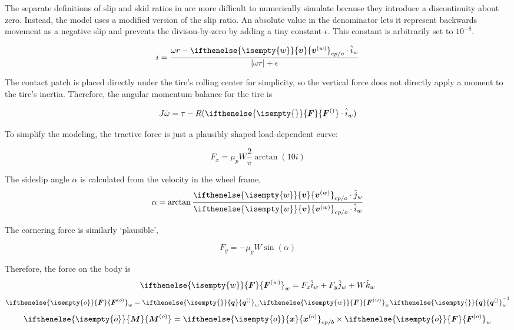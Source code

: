 \documentclass[9pt]{extarticle}
\renewcommand{\vec}[2][]{\ifthenelse{\isempty{#1}}{\boldsymbol{#2}}{\boldsymbol{#2}^{(#1)}} }
\begin{document}
\begin{multicols*}{2}
The separate definitions of slip and skid ratios in \cite{wongtires} are more
difficult to numerically simulate because they introduce a discontinuity about
zero. Instead, the model uses a modified version of the slip ratio. An absolute
value in the denominator lets it represent backwards movement as a negative slip
and prevents the divison-by-zero by adding a tiny constant \(\epsilon\).
This constant is arbitrarily set to \(10^{-8}\).

\begin{equation}
	i = \frac{\omega r - \vec[w]{v}_{cp/o} \cdot\hat{i}_{w}}{|\omega r| +
	\epsilon}
\end{equation}

The contact patch is placed directly under the tire's rolling center for
simplicity, so the vertical force does not directly apply a moment to the tire's
inertia. Therefore, the angular momentum balance for the tire is

\begin{equation}
	J\dot{\omega} = \tau - R(\vec{F}\cdot \hat{i}_w)
\end{equation}

 To simplify the modeling, the tractive force is just a plausibly shaped
 load-dependent curve:

\begin{equation}
	F_x = \mu_p W\frac{2}{\pi}\arctan(10i)
\end{equation}

The sideslip angle \(\alpha\) is calculated from the velocity in the wheel frame,
\begin{equation}
	\alpha = \arctan\frac{\vec[w]{v}_{cp/o} \cdot \hat{j}_w}
	{\vec[w]{v}_{cp/o} \cdot \hat{i}_w}
\end{equation}

The cornering force is similarly `plausible',

\begin{equation}\label{eq:cornering}
	F_y = -\mu_p W\sin(\alpha)
\end{equation}

Therefore, the force on the body is
\begin{equation}
	\vec[w]{F}_w = F_x \hat{i}_w + F_y \hat{j}_w + W \hat{k}_w
\end{equation}
\begin{equation}\label{eq:force}
	\vec[o]{F}_w = \vec{q}_w \vec[w]{F}_w \vec{q}_w^{-1} 
\end{equation}
\begin{equation}\label{eq:moment}
	\vec[o]{M} = \vec[o]{x}_{cp/b} \times \vec[o]{F}_w
\end{equation}


\end{multicols*}
\end{document}
